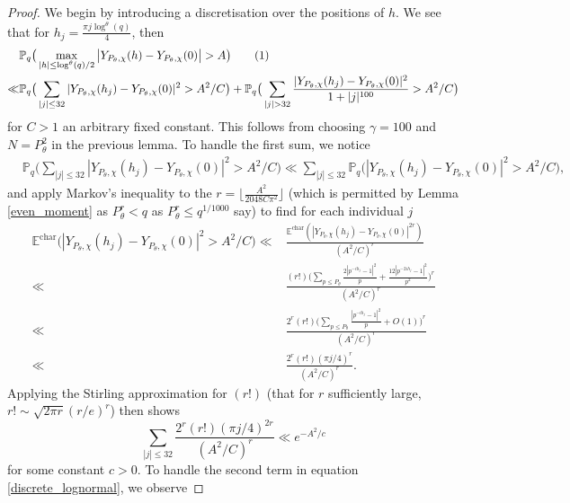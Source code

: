 \documentclass[reqno]{amsart}
\theoremstyle{definition}
\theoremstyle{remark}
\numberwithin{equation}{section}
\newcommand\numberthis{\addtocounter{equation}{1}\tag{\theequation}}
\theoremstyle{remark}
\begin{document}
\begin{proof}
    We begin by introducing a discretisation over the positions of $h$. We see that for $h_j = \frac{\pi j \log^{\theta}(q)}{4}$, then
    \begin{align*}
        &\mathbb{P}_q\big(\max_{|h| \leq \log^{\theta}(q)/2}\big|Y_{P_\theta,\chi}(h)-Y_{P_\theta,\chi}(0) \big| > A\big) \numberthis \label{discrete_lognormal} \\
        \ll& \mathbb{P}_q\big(\sum_{|j| \leq 32}|Y_{P_\theta,\chi}(h_j)-Y_{P_\theta,\chi}(0)|^2 > A^2/C\big) + \mathbb{P}_q\big(\sum_{|j| > 32}\frac{|Y_{P_\theta,\chi}(h_j)-Y_{P_\theta,\chi}(0)|^2}{1+|j|^{100}} > A^2/C\big)
    \end{align*}
    for $C>1$ an arbitrary fixed constant. This follows from choosing $\gamma=100$ and $N=P_\theta^2$ in the previous lemma. To handle the first sum, we notice
    \begin{align*}
        &\mathbb{P}_q\big(\sum_{|j| \leq 32}|Y_{P_\theta,\chi}(h_j)-Y_{P_\theta,\chi}(0)|^2 > A^2/C\big) \ll \sum_{|j| \leq 32}\mathbb{P}_q\big(|Y_{P_\theta,\chi}(h_j)-Y_{P_\theta,\chi}(0)|^2 > A^2/C\big),
    \end{align*}
    and apply Markov's inequality to the $r=\lfloor \frac{A^2}{2048C\pi^2}\rfloor$ (which is permitted by Lemma \ref{even_moment} as $P_\theta^r < q$ as $P_\theta^r \leq q^{1/1000}$ say) to find for each individual $j$
    \begin{align*}
        \mathbb{E}^{\text{char}}\bigg(|Y_{P_\theta,\chi}(h_j)-Y_{P_\theta,\chi}(0)|^2 > A^2/C\bigg)
        \ll& \frac{\mathbb{E}^{\text{char}}(|Y_{P_\theta,\chi}(h_j)-Y_{P_\theta,\chi}(0)|^{2r})}{(A^2/C)^{r}} \\ \ll& \frac{(r!)\big(\sum_{p \leq P_\theta}\frac{2|p^{-ih_j}-1|^2}{p}+\frac{12|p^{-2ih_j}-1|^2}{p^2}\big)^r}{(A^2/C)^r} \\
        \ll& \frac{2^r(r!)\big(\sum_{p \leq P_\theta}\frac{|p^{-ih_j}-1|^2}{p}+O(1)\big)^r}{(A^2/C)^r} \\
        \ll& \frac{2^r(r!)(\pi j/4)^{r}}{(A^2/C)^{r}}.
    \end{align*}
    Applying the Stirling approximation for $(r!)$ (that for $r$ sufficiently large, $r! \sim \sqrt{2\pi r}(r/e)^r$) then shows
    \begin{equation}
        \sum_{|j| \leq 32}\frac{2^r(r!)(\pi j/4)^{2r}}{(A^2/C)^{r}} \ll e^{-A^2/c} \label{small_j}
    \end{equation}
    for some constant $c>0$. To handle the second term in equation \ref{discrete_lognormal}, we observe

\end{proof}
\end{document}
